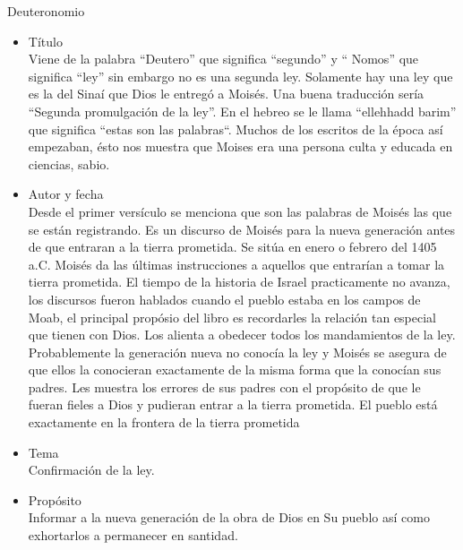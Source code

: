 %

%
\begin{section}{Deuteronomio}
	\begin{itemize}
		\item Título\\
Viene de la palabra ``Deutero'' que significa ``segundo'' y `` Nomos'' que significa ``ley'' sin embargo no es una segunda ley. Solamente hay una ley que es la del Sinaí que Dios le entregó a Moisés. Una buena traducción sería ``Segunda promulgación de la ley''. En el hebreo se le llama ``ellehhadd barim'' que significa ``estas son las palabras``. Muchos de los escritos de la época así empezaban, ésto nos muestra que Moises era una persona culta y educada en ciencias, sabio.
		\item Autor y fecha\\
			Desde el primer versículo se menciona que son las palabras de Moisés las que se están registrando. Es un discurso de Moisés para la nueva generación antes de que entraran a la tierra prometida. Se sitúa en enero o febrero del 1405 a.C. Moisés da las últimas instrucciones a aquellos que entrarían a tomar la tierra prometida. El tiempo de la historia de Israel practicamente no avanza, los discursos fueron hablados cuando el pueblo estaba en los campos de Moab, el principal propósio del libro es recordarles la relación tan especial que tienen con Dios. Los alienta a obedecer todos los mandamientos de la ley. Probablemente la generación nueva no conocía la ley y Moisés se asegura de que ellos la conocieran exactamente de la misma forma que la conocían sus padres. Les muestra los errores de sus padres con el propósito de que le fueran fieles a Dios y pudieran entrar a la tierra prometida. El pueblo está exactamente en la frontera de la tierra prometida\\

		\item Tema\\
Confirmación de la ley.
		\item Propósito\\
		Informar a la nueva generación de la obra de Dios en Su pueblo así como exhortarlos a permanecer en santidad.
	\end{itemize}
	

\end{section}
